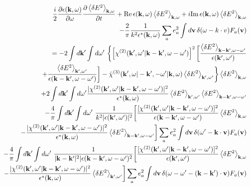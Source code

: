 \documentclass[10pt,aspectratio=1610,lualatex]{beamer}
\begin{document}
\begin{frame}\vspace{-0.6cm}
  \begin{eqnarray}
    &&\frac{i}{2}\frac{\partial \epsilon({\bf k},\omega)}{\partial \omega}
       \frac{\partial \left<\delta E^2\right>_{{\bf k},\omega}}{\partial t}
       +\mbox{Re}\,\epsilon({\bf k},\omega)\left<\delta E^2 \right>_{{\bf k},\omega}
       +i\mbox{Im}\,\epsilon({\bf k},\omega)\left<\delta E^2 \right>_{{\bf k},\omega}
       \nonumber\\
    &&\qquad \qquad \qquad -\frac{2}{\pi}\frac{1}{k^2\epsilon^*({\bf k},\omega)}
       \sum_ae_a^2\int d{\bf v}\,\delta(\omega-{k\cdot v})F_a({\bf v})
       \nonumber\\
    &&=-2\int d{\bf k'} \int d\omega '\
       \biggl\{ \left[\chi^{(2)}({\bf k'},\omega '|{\bf k-k'},
       \omega-\omega ')\right]^2
       \biggl[\frac{\left<\delta E^2\right>_{{\bf k - k'},\omega-\omega '}}
       {\epsilon({\bf k'},\omega ')}
       \nonumber\\
    &&+\frac{\left<\delta E^2\right>_{{\bf k'},\omega '}}
       {\epsilon({\bf k - k'},\omega-\omega ')}\biggr]
       -\bar \chi^{(3)}({\bf k'},\omega|-{\bf k'},-\omega '|{\bf k},\omega)
       \left<\delta E^2\right>_{{\bf k'},\omega'}\biggr\}
       \left<\delta E^2\right>_{{\bf k},\omega}\nonumber\\
    &&+2\int d{\bf k'} \int d\omega '
       \frac{|\chi^{(2)}({\bf k'},\omega '|{\bf k-k'},\omega-\omega ')|^2}
       {\epsilon^*({\bf k},\omega)}
       \left<\delta E^2\right>_{{\bf k'},\omega '}
       \left<\delta E^2\right>_{{\bf k-k'},\omega-\omega '}
       \label{nlebe}\\
    &&-\frac{4}{\pi}\int d{\bf k '} \int d\omega '\
       \frac{1}{k^2|\epsilon({\bf k'},\omega ')|^2}
       \biggl[ \frac{[\chi^{(2)}({\bf k'},\omega '|{\bf k-k'},\omega-\omega ')]^2}
       {\epsilon({\bf k-k'},\omega-\omega ')}
       \left<\delta E^2 \right>_{{\bf k},\omega}
       \nonumber\\
    &&-\frac{|\chi^{(2)}({\bf k'},\omega '|{\bf k-k'},\omega-\omega ')|^2}
       {\epsilon^*({\bf k},\omega)}
       \left<\delta E^2 \right>_{{\bf k-k'},\omega-\omega '}\biggr]
       \sum_ae_a^2\int d{\bf v}\, \delta(\omega '-{\bf k \cdot v})F_a({\bf v})
       \nonumber\\
    &&-\frac{4}{\pi}\int d{\bf k '} \int d\omega '\
       \frac{1}{|{\bf k - k'}|^2|\epsilon({\bf k-k'},\omega-\omega ')^2}
       \biggl[ \frac{[\chi^{(2)}({\bf k'},\omega '|{\bf k-k'},\omega-\omega ')]^2}
       {\epsilon({\bf k'},\omega ')}\left<\delta E^2 \right>_{{\bf k},\omega}
       \nonumber\\
    &&-\frac{|\chi^{(2)}({\bf k'},\omega '|{\bf k-k'},\omega-\omega ')|^2}
       {\epsilon^*({\bf k},\omega)}
       \left<\delta E^2 \right>_{{\bf k'},\omega '}\biggr]\sum_ae_a^2\int d{\bf v}\,
       \delta(\omega-\omega '-{\bf (k-k')\cdot v})F_a({\bf v})
       \nonumber
  \end{eqnarray}
\end{frame}
\end{document}
